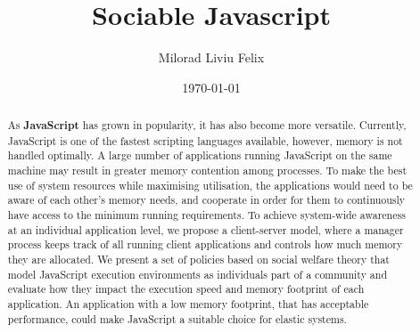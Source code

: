 \documentclass{l4proj}
\begin{document}
\title{Sociable Javascript}
\author{Milorad Liviu Felix}
\date{\today}
\maketitle
\educationalconsent
%
%
\newpage
\begin{abstract}
   As \textbf{JavaScript} has grown in popularity, it has also become more versatile. Currently, JavaScript is one of the fastest scripting languages available, however, memory is not handled optimally. A large number of applications running JavaScript on the same machine may result in greater memory contention among processes. To make the best use of system resources while maximising utilisation, the applications would need to be aware of each other's memory needs, and cooperate in order for them to continuously have access to the minimum running requirements. To achieve system-wide awareness at an individual application level, we propose a client-server model, where a manager process keeps track of all running client applications and controls how much memory they are allocated. We present a set of policies based on social welfare theory that model JavaScript execution environments as individuals part of a community and evaluate how they impact the execution speed and memory footprint of each application. An application with a low memory footprint, that has acceptable performance, could make JavaScript a suitable choice for elastic systems.
\end{abstract}
\newpage
\tableofcontents
\newpage
{}
\end{document}
